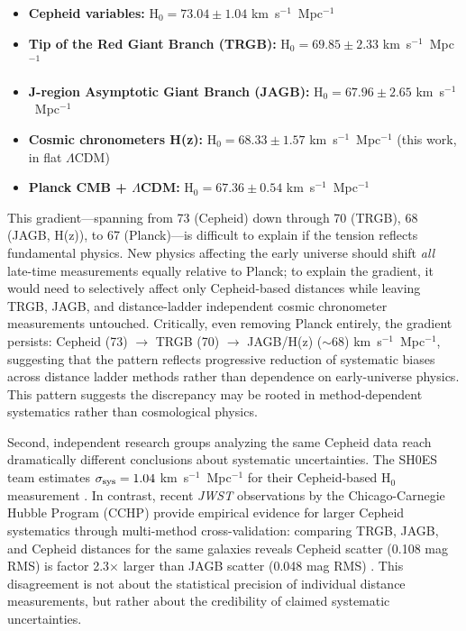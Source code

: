 \documentclass[preprint, linenumbers]{aastex701}
\begin{document}
\begin{itemize}
\item \textbf{Cepheid variables:} H$_0 = 73.04 \pm 1.04$ km~s$^{-1}$~Mpc$^{-1}$ \citep{Riess2022}
\item \textbf{Tip of the Red Giant Branch (TRGB):} H$_0 = 69.85 \pm 2.33$ km~s$^{-1}$~Mpc$^{-1}$ \citep{Freedman2025a}
\item \textbf{J-region Asymptotic Giant Branch (JAGB):} H$_0 = 67.96 \pm 2.65$ km~s$^{-1}$~Mpc$^{-1}$ \citep{Freedman2025a}
\item \textbf{Cosmic chronometers H(z):} H$_0 = 68.33 \pm 1.57$ km~s$^{-1}$~Mpc$^{-1}$ (this work, in flat $\Lambda$CDM)
\item \textbf{Planck CMB + $\Lambda$CDM:} H$_0 = 67.36 \pm 0.54$ km~s$^{-1}$~Mpc$^{-1}$ \citep{Planck2018}
\end{itemize}

This gradient---spanning from 73 (Cepheid) down through 70 (TRGB), 68 (JAGB, H(z)), to 67 (Planck)---is difficult to explain if the tension reflects fundamental physics. New physics affecting the early universe should shift \textit{all} late-time measurements equally relative to Planck; to explain the gradient, it would need to selectively affect only Cepheid-based distances while leaving TRGB, JAGB, and distance-ladder independent cosmic chronometer measurements untouched. Critically, even removing Planck entirely, the gradient persists: Cepheid (73) $\rightarrow$ TRGB (70) $\rightarrow$ JAGB/H(z) ($\sim$68) km~s$^{-1}$~Mpc$^{-1}$, suggesting that the pattern reflects progressive reduction of systematic biases across distance ladder methods rather than dependence on early-universe physics. This pattern suggests the discrepancy may be rooted in method-dependent systematics rather than cosmological physics.

Second, independent research groups analyzing the same Cepheid data reach dramatically different conclusions about systematic uncertainties. The SH0ES team estimates $\sigma_{\rm sys} = 1.04$ km~s$^{-1}$~Mpc$^{-1}$ for their Cepheid-based H$_0$ measurement \citep{Riess2022}. In contrast, recent \textit{JWST} observations by the Chicago-Carnegie Hubble Program (CCHP) provide empirical evidence for larger Cepheid systematics through multi-method cross-validation: comparing TRGB, JAGB, and Cepheid distances for the same galaxies reveals Cepheid scatter (0.108 mag RMS) is factor 2.3$\times$ larger than JAGB scatter (0.048 mag RMS) \citep{Freedman2025a}. This disagreement is not about the statistical precision of individual distance measurements, but rather about the credibility of claimed systematic uncertainties.
\end{document}
